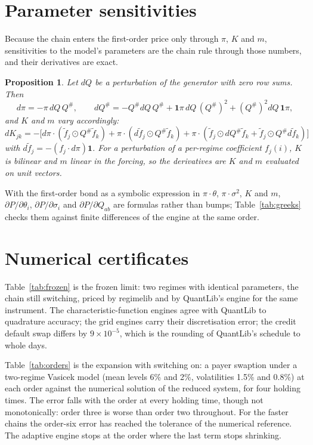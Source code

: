 \documentclass[11pt]{article}
\newtheorem{proposition}[theorem]{Proposition}
\theoremstyle{remark}
\newcommand{\rl}{\textsf{regimelib}}
\newcommand{\ql}{\textsf{QuantLib}}
\begin{document}
\section{Parameter sensitivities}
\label{sec:greeks}

Because the chain enters the first-order price only through $\pi$, $K$ and $m$, sensitivities to the model's
parameters are the chain rule through those numbers, and their derivatives are exact.

\begin{proposition}
Let $dQ$ be a perturbation of the generator with zero row sums. Then
\[
  d\pi = -\pi\, dQ\, Q^{\#}, \qquad
  dQ^{\#} = -Q^{\#}dQ\,Q^{\#} + \mathbf 1\pi\, dQ\,(Q^{\#})^2 + (Q^{\#})^2 dQ\,\mathbf 1\pi,
\]
and $K$ and $m$ vary accordingly: $dK_{jk} = -\big[d\pi\cdot(\tilde f_j\odot Q^{\#}\tilde f_k) + \pi\cdot(d\tilde f_j\odot Q^{\#}\tilde f_k) + \pi\cdot(\tilde f_j\odot dQ^{\#}\tilde f_k + \tilde f_j\odot Q^{\#}d\tilde f_k)\big]$ with $d\tilde f_j = -(f_j\cdot d\pi)\mathbf 1$.
For a perturbation of a per-regime coefficient $f_j(i)$, $K$ is bilinear and $m$ linear in the forcing, so the
derivatives are $K$ and $m$ evaluated on unit vectors.
\end{proposition}

With the first-order bond as a symbolic expression in $\pi\cdot\theta$, $\pi\cdot\sigma^2$, $K$ and $m$,
$\partial P/\partial\theta_i$, $\partial P/\partial\sigma_i$ and $\partial P/\partial Q_{ab}$
are formulas rather than bumps; Table~\ref{tab:greeks} checks them against finite differences of the engine at
the same order.

\section{Numerical certificates}
\label{sec:numerics}

Table~\ref{tab:frozen} is the frozen limit: two regimes with identical parameters, the chain still switching,
priced by \rl{} and by \ql{}'s engine for the same instrument. The characteristic-function engines agree with
\ql{} to quadrature accuracy; the grid engines carry their discretisation error; the credit default swap
differs by $9\times10^{-5}$, which is the rounding of \ql{}'s schedule to whole days.

Table~\ref{tab:orders} is the expansion with switching on: a payer swaption under a two-regime Vasicek model
(mean levels 6\% and 2\%, volatilities 1.5\% and 0.8\%) at each order against the numerical solution of the
reduced system, for four holding times. The error falls with the order at every holding time, though not
monotonically: order three is worse than order two throughout. For the faster chains the order-six error has
reached the tolerance of the numerical reference. The adaptive engine stops at the order where the last term
stops shrinking.
\end{document}
